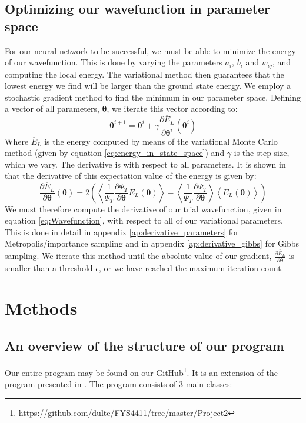 \documentclass[a4paper, 10pt]{article}
\begin{document}
	\subsection{Optimizing our wavefunction in parameter space}
	For our neural network to be successful, we must be able to minimize the energy of our wavefunction. This is done by varying the parameters $a_i$, $b_i$ and $w_{ij}$, and computing the local energy. The variational method then guarantees that the lowest energy we find will be larger than the ground state energy. We employ a stochastic gradient method to find the minimum in our parameter space. Defining a vector of all parameters, $\boldsymbol{\theta}$, we iterate this vector according to:
	\begin{equation}\label{eq:Minimization_theory}
	\boldsymbol{\theta}^{i+1}=\boldsymbol{\theta}^i + \gamma \frac{\partial \overline{E}_L}{\partial \boldsymbol{\theta}^i}(\boldsymbol{\theta}^i)
	\end{equation}
	Where $\overline{E}_L$ is the energy computed by means of the variational Monte Carlo method (given by equation \ref{eq:energy_in_state_space}) and $\gamma$ is the step size, which we vary. The derivative is with respect to all parameters. It is shown in \cite{Heinsen2018} that the derivative of this expectation value of the energy is given by:
	\begin{equation}
	\frac{\partial \overline{E}_L}{\partial \boldsymbol{\theta}}(\boldsymbol{\theta})=2\left(\left\langle \frac{1}{\Psi_T}\frac{\partial \Psi_T}{\partial \boldsymbol{\theta}}\overline{E}_L(\boldsymbol{\theta})\right\rangle-\left\langle \frac{1}{\Psi_T}\frac{\partial \Psi_T}{\partial \boldsymbol{\theta}}\right\rangle\left\langle \overline{E}_L(\boldsymbol{\theta})\right\rangle\right)
	\end{equation}
	We must therefore compute the derivative of our trial wavefunction, given in equation \ref{eq:Wavefunction}, with respect to all of our variational parameters.
	This is done in detail in appendix \ref{ap:derivative_parameters} for Metropolis/importance sampling and in appendix \ref{ap:derivative_gibbs} for Gibbs sampling. We iterate this method until the absolute value of our gradient, $\frac{\partial \overline{E}_L}{\partial \boldsymbol{\theta}}$  is smaller than a threshold $\epsilon$, or we have reached the maximum iteration count.
	\section{Methods}\label{Method_section}
	\subsection{An overview of the structure of our program}
	Our entire program may be found on our \href{https://github.com/dulte/FYS4411/tree/master/Project2}{GitHub}\footnote{\url{https://github.com/dulte/FYS4411/tree/master/Project2}}. It is an extension of the program presented in \cite{Heinsen2018}. The program consists of $3$ main classes:
\end{document}
